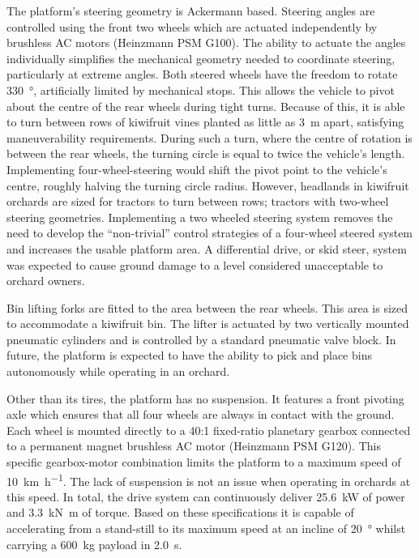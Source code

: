 \documentclass[preprint,authoryear,12pt]{elsarticle}
\begin{document}
        The platform's steering geometry is Ackermann based.
        Steering angles are controlled using the front two wheels which are actuated independently by brushless AC motors (Heinzmann PSM G100).
        The ability to actuate the angles individually simplifies the mechanical geometry needed to coordinate steering, particularly at extreme angles.
        Both steered wheels have the freedom to rotate \SI{330}{\degree}, artificially limited by mechanical stops.
        This allows the vehicle to pivot about the centre of the rear wheels during tight turns.
        Because of this, it is able to turn between rows of kiwifruit vines planted as little as \SI{3}{\meter} apart, satisfying maneuverability requirements.
        During such a turn, where the centre of rotation is between the rear wheels, the turning circle is equal to twice the vehicle's length.
        Implementing four-wheel-steering would shift the pivot point to the vehicle's centre, roughly halving the turning circle radius.
        However, headlands in kiwifruit orchards are sized for tractors to turn between rows; tractors with two-wheel steering geometries.
        Implementing a two wheeled steering system removes the need to develop the ``non-trivial'' control strategies of a four-wheel steered system and increases the usable platform area.
        A differential drive, or skid steer, system was expected to cause ground damage to a level considered unacceptable to orchard owners.

        Bin lifting forks are fitted to the area between the rear wheels.
        This area is sized to accommodate a kiwifruit bin.
        The lifter is actuated by two vertically mounted pneumatic cylinders and is controlled by a standard pneumatic valve block.
        In future, the platform is expected to have the ability to pick and place bins autonomously while operating in an orchard.

        Other than its tires, the platform has no suspension.
        It features a front pivoting axle which ensures that all four wheels are always in contact with the ground.
        Each wheel is mounted directly to a 40:1 fixed-ratio planetary gearbox connected to a permanent magnet brushless AC motor (Heinzmann PSM G120).
        This specific gearbox-motor combination limits the platform to a maximum speed of \SI{10}{\kilo\meter\per\hour}.
        The lack of suspension is not an issue when operating in orchards at this speed.
        In total, the drive system can continuously deliver \SI{25.6}{\kilo\watt} of power and \SI{3.3}{\kilo\newton\meter} of torque.
        Based on these specifications it is capable of accelerating from a stand-still to its maximum speed at an incline of \SI{20}{\degree} whilst carrying a \SI{600}{\kilo\gram} payload in \SI{2.0}{\second}.
\end{document}
